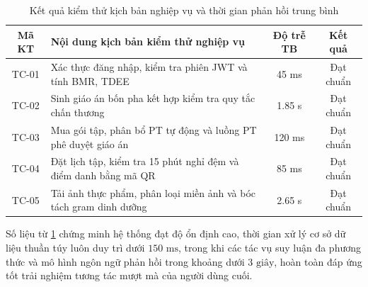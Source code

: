 \begin{table}[htbp]
\centering
\small
\caption{Kết quả kiểm thử kịch bản nghiệp vụ và thời gian phản hồi trung bình}
\label{tab:system_test}
\begin{tabularx}{\textwidth}{c >{\raggedright\arraybackslash}X c c}
    \toprule
    \textbf{Mã KT} & \textbf{Nội dung kịch bản kiểm thử nghiệp vụ} & \textbf{Độ trễ TB} & \textbf{Kết quả} \\
    \midrule
    TC-01 & Xác thực đăng nhập, kiểm tra phiên JWT và tính BMR, TDEE & 45 ms & Đạt chuẩn \\
    \addlinespace[3pt]
    TC-02 & Sinh giáo án bốn pha kết hợp kiểm tra quy tắc chấn thương & 1.85 s & Đạt chuẩn \\
    \addlinespace[3pt]
    TC-03 & Mua gói tập, phân bổ PT tự động và luồng PT phê duyệt giáo án & 120 ms & Đạt chuẩn \\
    \addlinespace[3pt]
    TC-04 & Đặt lịch tập, kiểm tra 15 phút nghỉ đệm và điểm danh bằng mã QR & 85 ms & Đạt chuẩn \\
    \addlinespace[3pt]
    TC-05 & Tải ảnh thực phẩm, phân loại miền ảnh và bóc tách gram dinh dưỡng & 2.65 s & Đạt chuẩn \\
    \bottomrule
\end{tabularx}
\end{table}

Số liệu từ \cref{tab:system_test} chứng minh hệ thống đạt độ ổn định cao, thời gian xử lý cơ sở dữ liệu thuần túy luôn duy trì dưới $150\text{ ms}$, trong khi các tác vụ suy luận đa phương thức và mô hình ngôn ngữ phản hồi trong khoảng dưới $3\text{ giây}$, hoàn toàn đáp ứng tốt trải nghiệm tương tác mượt mà của người dùng cuối.
